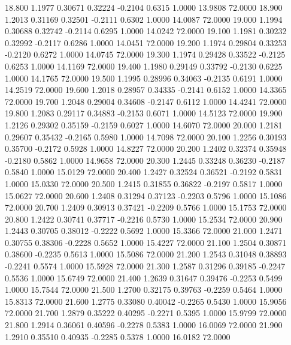   18.800   1.1977   0.30671   0.32224  -0.2104   0.6315   1.0000  13.9808  72.0000
  18.900   1.2013   0.31169   0.32501  -0.2111   0.6302   1.0000  14.0087  72.0000
  19.000   1.1994   0.30688   0.32742  -0.2114   0.6295   1.0000  14.0242  72.0000
  19.100   1.1981   0.30232   0.32992  -0.2117   0.6286   1.0000  14.0451  72.0000
  19.200   1.1974   0.29804   0.33253  -0.2120   0.6272   1.0000  14.0745  72.0000
  19.300   1.1974   0.29428   0.33522  -0.2125   0.6253   1.0000  14.1169  72.0000
  19.400   1.1980   0.29149   0.33792  -0.2130   0.6225   1.0000  14.1765  72.0000
  19.500   1.1995   0.28996   0.34063  -0.2135   0.6191   1.0000  14.2519  72.0000
  19.600   1.2018   0.28957   0.34335  -0.2141   0.6152   1.0000  14.3365  72.0000
  19.700   1.2048   0.29004   0.34608  -0.2147   0.6112   1.0000  14.4241  72.0000
  19.800   1.2083   0.29117   0.34883  -0.2153   0.6071   1.0000  14.5123  72.0000
  19.900   1.2126   0.29302   0.35159  -0.2159   0.6027   1.0000  14.6070  72.0000
  20.000   1.2181   0.29607   0.35432  -0.2165   0.5980   1.0000  14.7098  72.0000
  20.100   1.2256   0.30193   0.35700  -0.2172   0.5928   1.0000  14.8227  72.0000
  20.200   1.2402   0.32374   0.35948  -0.2180   0.5862   1.0000  14.9658  72.0000
  20.300   1.2445   0.33248   0.36230  -0.2187   0.5840   1.0000  15.0129  72.0000
  20.400   1.2427   0.32524   0.36521  -0.2192   0.5831   1.0000  15.0330  72.0000
  20.500   1.2415   0.31855   0.36822  -0.2197   0.5817   1.0000  15.0627  72.0000
  20.600   1.2408   0.31294   0.37123  -0.2203   0.5796   1.0000  15.1086  72.0000
  20.700   1.2409   0.30913   0.37421  -0.2209   0.5766   1.0000  15.1753  72.0000
  20.800   1.2422   0.30741   0.37717  -0.2216   0.5730   1.0000  15.2534  72.0000
  20.900   1.2443   0.30705   0.38012  -0.2222   0.5692   1.0000  15.3366  72.0000
  21.000   1.2471   0.30755   0.38306  -0.2228   0.5652   1.0000  15.4227  72.0000
  21.100   1.2504   0.30871   0.38600  -0.2235   0.5613   1.0000  15.5086  72.0000
  21.200   1.2543   0.31048   0.38893  -0.2241   0.5574   1.0000  15.5928  72.0000
  21.300   1.2587   0.31296   0.39185  -0.2247   0.5536   1.0000  15.6749  72.0000
  21.400   1.2639   0.31647   0.39476  -0.2253   0.5499   1.0000  15.7544  72.0000
  21.500   1.2700   0.32175   0.39763  -0.2259   0.5464   1.0000  15.8313  72.0000
  21.600   1.2775   0.33080   0.40042  -0.2265   0.5430   1.0000  15.9056  72.0000
  21.700   1.2879   0.35222   0.40295  -0.2271   0.5395   1.0000  15.9799  72.0000
  21.800   1.2914   0.36061   0.40596  -0.2278   0.5383   1.0000  16.0069  72.0000
  21.900   1.2910   0.35510   0.40935  -0.2285   0.5378   1.0000  16.0182  72.0000
